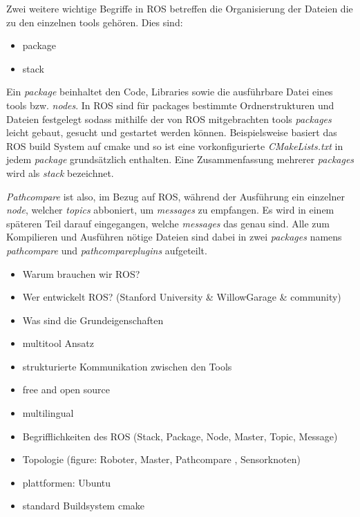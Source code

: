 Zwei weitere wichtige Begriffe in \gls{ROS} betreffen die Organisierung der
Dateien die zu den einzelnen tools gehören. Dies sind:

\begin{itemize}
  \item package
  \item stack
\end{itemize}

Ein \textit{package} beinhaltet den Code, Libraries sowie die ausführbare Datei
eines tools bzw. \textit{nodes}.  In \gls{ROS} sind für packages bestimmte
Ordnerstrukturen und Dateien festgelegt sodass mithilfe der von \gls{ROS}
mitgebrachten tools \textit{packages} leicht gebaut, gesucht und gestartet
werden können. Beispielsweise basiert das \gls{ROS} build System auf cmake und
so ist eine vorkonfigurierte \textit{CMakeLists.txt} in jedem \textit{package}
grundsätzlich enthalten. Eine Zusammenfassung mehrerer \textit{packages} wird
als \textit{stack} bezeichnet. 

\textit{Pathcompare} ist also, im Bezug auf \gls{ROS}, während der Ausführung
ein einzelner \textit{node}, welcher \textit{topics} abboniert, um
\textit{messages} zu empfangen. Es wird in einem späteren Teil darauf
eingegangen, welche \textit{messages} das genau sind.  Alle zum Kompilieren und
Ausführen nötige Dateien sind dabei in zwei \textit{packages} namens
\textit{pathcompare} und \textit{pathcompareplugins} aufgeteilt.


\begin{itemize}
  \item Warum brauchen wir ROS?
  \item Wer entwickelt ROS? (Stanford University \& WillowGarage \& community)
  \item Was sind die Grundeigenschaften 
  \item multitool Ansatz
  \item strukturierte Kommunikation zwischen den Tools
  \item free and open source
  \item multilingual 
  \item Begrifflichkeiten des ROS (Stack, Package, Node, Master, Topic, Message)
  \item Topologie (figure: Roboter, Master, Pathcompare , Sensorknoten)
  \item plattformen: Ubuntu
  \item standard Buildsystem cmake
\end{itemize}

